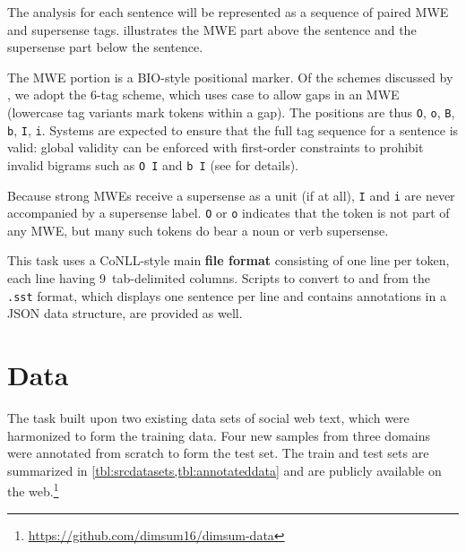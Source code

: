 \documentclass[11pt,letterpaper]{article}
\newcommand{\longversion}[1]{#1} %
\begin{document}
The analysis for each sentence will be represented as 
a sequence of paired MWE and supersense tags.  illustrates 
the MWE part above the sentence and the supersense part below the sentence.

The MWE portion is a BIO-style \citep{ramshaw-95} 
positional marker. Of the schemes discussed by \citet{schneider-14}, 
we adopt the 6-tag scheme, which uses case to allow gaps in an MWE (lowercase tag variants mark 
tokens within a gap).
The positions are thus \texttt{O}, \texttt{o}, \texttt{B}, \texttt{b},
\texttt{I}, \texttt{i}.
Systems are expected to ensure that the full tag sequence for a sentence is valid: 
global validity can be enforced with first-order constraints 
to prohibit invalid bigrams such as \texttt{O~I} and \texttt{b~I} (see \citealp{schneider-14} for details).

Because strong MWEs receive a supersense as a unit (if at all), 
\texttt{I} and \texttt{i} are never accompanied by a supersense label.
\texttt{O} or \texttt{o} indicates that the token is not part of any MWE, 
but many such tokens do bear a noun or verb supersense.

This task uses a CoNLL-style main \textbf{file format}
consisting of one line per token, each line having 9~tab-delimited columns.
Scripts to convert to and from the \texttt{.sst} format, which displays one sentence per line 
and contains annotations in a JSON data structure, are provided as well.

\section{Data}\label{sec:data}

The task built upon two existing data sets of social web text, which were 
harmonized to form the training data. Four new samples from three domains 
were annotated from scratch to form the test set.
The train and test sets are summarized in \cref{tbl:srcdatasets,tbl:annotateddata} 
and are publicly available on the web.\footnote{\url{https://github.com/dimsum16/dimsum-data}}

\begin{table}\small\centering

\label{tbl:srcdatasets}
\end{table}

\begin{table}\small\centering

\label{tbl:annotateddata}
\end{table}
\end{document}

